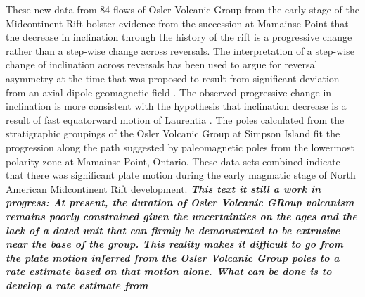 \documentclass[draft,gc]{AGUTeX}
\begin{document}
\begin{article}
These new data from 84 flows of Osler Volcanic Group from the early stage of the Midcontinent Rift bolster evidence from the succession at Mamainse Point that the decrease in inclination through the history of the rift is a progressive change rather than a step-wise change across reversals. The interpretation of a step-wise change of inclination across reversals has been used to argue for reversal asymmetry at the time that was proposed to result from significant deviation from an axial dipole geomagnetic field \citep{Pesonen1981a}. The observed progressive change in inclination is more consistent with the hypothesis that inclination decrease is a result of fast equatorward motion of Laurentia \citep{Davis1997a, Swanson-Hysell2009a}. The poles calculated from the stratigraphic groupings of the Osler Volcanic Group at Simpson Island fit the progression along the path suggested by paleomagnetic poles from the lowermost polarity zone at Mamainse Point, Ontario. These data sets combined indicate that there was significant plate motion during the early magmatic stage of North American Midcontinent Rift development. \textit{\textbf{This text it still a work in progress: At present, the duration of Osler Volcanic GRoup volcanism remains poorly constrained given the uncertainties on the ages and the lack of a dated unit that can firmly be demonstrated to be extrusive near the base of the group. This reality makes it difficult to go from the plate motion inferred from the Osler Volcanic Group poles to a rate estimate based on that motion alone. What can be done is to develop a rate estimate from}}



\end{article}
\end{document}

